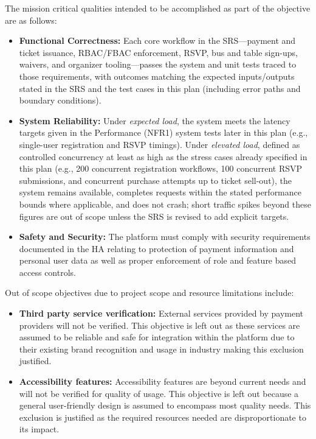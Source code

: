 \documentclass[12pt, titlepage]{article}
\begin{document}
The mission critical qualities intended to be accomplished as part of the objective are as follows:
\begin{itemize}
    \item \textbf{Functional Correctness:} Each core workflow in the SRS---payment and ticket issuance, RBAC/FBAC enforcement, RSVP, bus and table sign-ups, waivers, and organizer tooling---passes the system and unit tests traced to those requirements, with outcomes matching the expected inputs/outputs stated in the SRS and the test cases in this plan (including error paths and boundary conditions).
    \item \textbf{System Reliability:} Under \emph{expected load}, the system meets the latency targets given in the Performance (NFR1) system tests later in this plan (e.g., single-user registration and RSVP timings). Under \emph{elevated load}, defined as controlled concurrency at least as high as the stress cases already specified in this plan (e.g., 200 concurrent registration workflows, 100 concurrent RSVP submissions, and concurrent purchase attempts up to ticket sell-out), the system remains available, completes requests within the stated performance bounds where applicable, and does not crash; short traffic spikes beyond these figures are out of scope unless the SRS is revised to add explicit targets.
    \item \textbf{Safety and Security:} The platform must comply with security requirements documented in the HA relating to protection of payment information and personal user data as well as proper enforcement of role and feature based access controls.    
\end{itemize}

Out of scope objectives due to project scope and resource limitations include:
\begin{itemize}
    \item \textbf{Third party service verification:} External services provided by payment providers will not be verified. This objective is left out as these services are assumed to be reliable and safe for integration within the platform due to their existing brand recognition and usage in industry making this exclusion justified. 
    \item \textbf{Accessibility features:} Accessibility features are beyond current needs and will not be verified for quality of usage. This objective is left out because a general user-friendly design is assumed to encompass most quality needs. This exclusion is justified as the required resources needed are disproportionate to its impact.    
\end{itemize}
\end{document}
